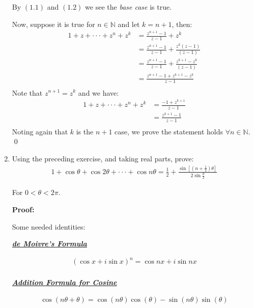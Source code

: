 \begin{enumerate}
	      By $(1.1)$ and $(1.2)$ we see the \emph{base case} is true.

	      Now, suppose it is true for $n \in \mathbb{N}$ and let $k = n + 1$, then:
	      \begin{align*}
		      1 + z + \cdot\cdot\cdot + z^n + z^k
		       & = \frac{z^{n + 1} - 1}{z - 1} + z^k                             \\
		       & = \frac{z^{n + 1} - 1}{z - 1} + \frac{z^k(z - 1)}{(z - 1)}      \\
		       & = \frac{z^{n + 1} - 1}{z - 1} + \frac{z^{k + 1} - z^k}{(z - 1)} \\
		       & = \frac{z^{n + 1} - 1 + z^{k + 1} - z^k}{z - 1}                 \\
	      \end{align*}
	      Note that $z^{n + 1} = z^k$ and we have:
	      \begin{align*}
		      1 + z + \cdot\cdot\cdot + z^n + z^k & = \frac{ - 1 + z^{k + 1}}{z - 1} \\
		                                          & = \frac{z^{k + 1} - 1}{z - 1}    \\
	      \end{align*}
	      Noting again that $k$ is the $n + 1$ case, we prove the statement holds $\forall n \in \mathbb{N}.$
	      \qed

	\item Using the preceding exercise, and taking real parts, prove:
	      \begin{align*}
		      1 + \cos\theta + \cos2\theta + \cdot\cdot\cdot + \cos n\theta = \frac{1}{2}
		      + \frac{\sin[(n + \frac{1}{2})\theta]}{2\sin{\frac{\theta}{2}}}
	      \end{align*}

	      For $0 < \theta < 2\pi.$

	      \textbf{Proof:}

	      Some needed identities:

	      \underline{\textit{\textbf{de Moivre's Formula}}}

	      \begin{align*}
		      \left( \cos x + i \sin x \right)^n = \cos nx + i \sin nx \\
	      \end{align*}

	      \underline{\textit{\textbf{{Addition Formula for Cosine}}}}

	      \begin{align*}
		      \cos(n\theta + \theta) = \cos(n\theta)\cos(\theta) - \sin(n\theta)\sin(\theta) \\
	      \end{align*}


\end{enumerate}
